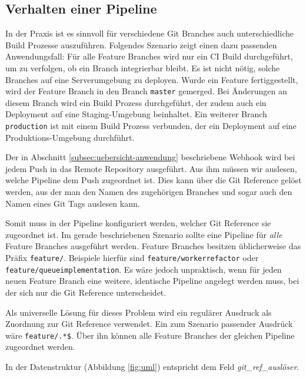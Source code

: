 \subsection{Verhalten einer Pipeline}

In der Praxis ist es sinnvoll für verschiedene Git Branches auch unterschiedliche Build Prozesse auszuführen. Folgendes Szenario zeigt einen dazu passenden Anwendungsfall: Für alle Feature Branches wird nur ein \ac{CI} Build durchgeführt, um zu verfolgen, ob ein Branch integrierbar bleibt. Es ist nicht nötig, solche Branches auf eine Serverumgebung zu deployen. Wurde ein Feature fertiggestellt, wird der Feature Branch in den Branch \texttt{master} gemerged. Bei Änderungen an diesem Branch wird ein Build Prozess durchgeführt, der zudem auch ein Deployment auf eine Staging-Umgebung beinhaltet. Ein weiterer Branch \texttt{production} ist mit einem Build Prozess verbunden, der ein Deployment auf eine Produktions-Umgebung durchführt.

Der in Abschnitt \ref{subsec:uebersicht-anwendung} beschriebene Webhook wird bei jedem Push in das Remote Repository ausgeführt. Aus ihm müssen wir auslesen, welche Pipeline dem Push zugeordnet ist. Dies kann über die Git Reference gelöst werden, aus der man den Namen des zugehörigen Branches und sogar auch den Namen eines Git Tags auslesen kann.

Somit muss in der Pipeline konfiguriert werden, welcher Git Reference sie zugeordnet ist. Im gerade beschriebenen Szenario sollte eine Pipeline für \emph{alle} Feature Branches ausgeführt werden. Feature Branches besitzen üblicherweise das Präfix \texttt{feature/}. Beispiele hierfür sind \texttt{feature/worker\-refactor} oder \texttt{feature/queue\-implementation}. Es wäre jedoch unpraktisch, wenn für jeden neuen Feature Branch eine weitere, identische Pipeline angelegt werden muss, bei der sich nur die Git Reference unterscheidet.

Als universelle Lösung für dieses Problem wird ein regulärer Ausdruck als Zuordnung zur Git Reference verwendet. Ein zum Szenario passender Ausdrück wäre \texttt{feature/.*\$}. Über ihn können alle Feature Branches der gleichen Pipeline zugeordnet werden.

In der Datenstruktur (Abbildung \ref{fig:uml}) entspricht dem Feld \emph{git\_ref\_auslöser}.
